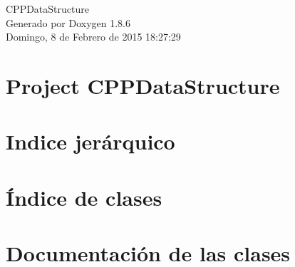 \documentclass[twoside]{book}
\newcommand{\clearemptydoublepage}{%
  \newpage{\pagestyle{empty}\cleardoublepage}%
}
\begin{document}
\hypersetup{pageanchor=false}
\begin{titlepage}
\vspace*{7cm}
\begin{center}%
{\Large C\-P\-P\-Data\-Structure }\\
\vspace*{1cm}
{\large Generado por Doxygen 1.8.6}\\
\vspace*{0.5cm}
{\small Domingo, 8 de Febrero de 2015 18:27:29}\\
\end{center}
\end{titlepage}
\clearemptydoublepage
\tableofcontents
\clearemptydoublepage
{}
\hypersetup{pageanchor=true}

\chapter{Project C\-P\-P\-Data\-Structure}
\label{md_README}
\hypertarget{md_README}{}

\chapter{Indice jerárquico}

\chapter{Índice de clases}

\chapter{Documentación de las clases}























\newpage
{}
{}
\printindex
\end{document}
